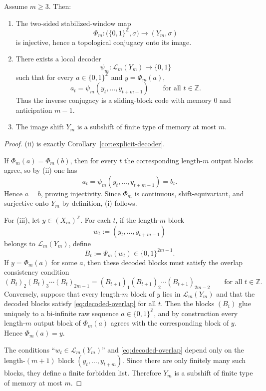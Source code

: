 \begin{theorem}\label{thm:two-sided-conjugacy}
Assume $m\ge 3$. Then:
\begin{enumerate}[label=(\roman*),leftmargin=*,itemsep=2pt]
  \item The two-sided stabilized-window map
  \[
  \Phi_m:\bigl(\{0,1\}^{\mathbb Z},\sigma\bigr)\to (Y_m,\sigma)
  \]
  is injective, hence a topological conjugacy onto its image.
  \item There exists a local decoder
  \[
  \psi_m:\mathcal L_m(Y_m)\to\{0,1\}
  \]
  such that for every $a\in\{0,1\}^{\mathbb Z}$ and $y=\Phi_m(a)$,
  \[
  a_t=\psi_m(y_t,\dots,y_{t+m-1})
  \qquad\text{for all }t\in\mathbb Z.
  \]
  Thus the inverse conjugacy is a sliding-block code with memory $0$ and anticipation $m-1$.
  \item The image shift $Y_m$ is a subshift of finite type of memory at most $m$.
\end{enumerate}
\end{theorem}

\begin{proof}
(ii) is exactly Corollary~\ref{cor:explicit-decoder}.

If $\Phi_m(a)=\Phi_m(b)$, then for every $t$ the corresponding length-$m$ output blocks agree, so by (ii) one has
\[
a_t=\psi_m(y_t,\dots,y_{t+m-1})=b_t.
\]
Hence $a=b$, proving injectivity. Since $\Phi_m$ is continuous, shift-equivariant, and surjective onto $Y_m$ by definition, (i) follows.

For (iii), let $y\in (X_m)^{\mathbb Z}$. For each $t$, if the length-$m$ block
\[
w_t:=(y_t,\dots,y_{t+m-1})
\]
belongs to $\mathcal L_m(Y_m)$, define
\[
B_t:=\Psi_m(w_t)\in\{0,1\}^{2m-1}.
\]
If $y=\Phi_m(a)$ for some $a$, then these decoded blocks must satisfy the overlap consistency condition
\begin{equation}\label{eq:decoded-overlap}
(B_t)_2(B_t)_3\cdots (B_t)_{2m-1}
=
(B_{t+1})_1(B_{t+1})_2\cdots (B_{t+1})_{2m-2}
\qquad\text{for all }t\in\mathbb Z.
\end{equation}
Conversely, suppose that every length-$m$ block of $y$ lies in $\mathcal L_m(Y_m)$ and that the decoded blocks satisfy \eqref{eq:decoded-overlap} for all $t$. Then the blocks $(B_t)$ glue uniquely to a bi-infinite raw sequence $a\in\{0,1\}^{\mathbb Z}$, and by construction every length-$m$ output block of $\Phi_m(a)$ agrees with the corresponding block of $y$. Hence $\Phi_m(a)=y$.

The conditions ``$w_t\in\mathcal L_m(Y_m)$'' and \eqref{eq:decoded-overlap} depend only on the length-$(m+1)$ block $(y_t,\dots,y_{t+m})$. Since there are only finitely many such blocks, they define a finite forbidden list. Therefore $Y_m$ is a subshift of finite type of memory at most $m$.
\end{proof}

